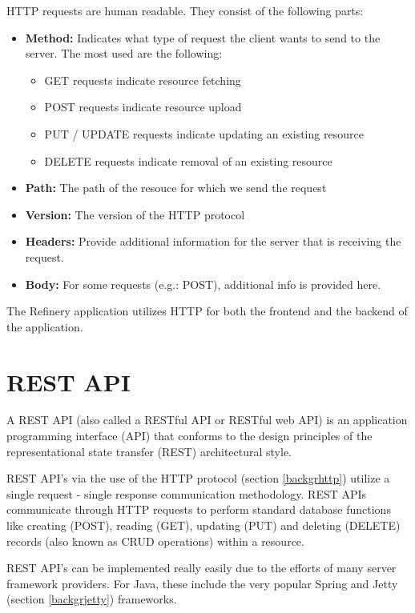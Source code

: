	HTTP requests are human readable. They consist of the following parts:
	\begin{itemize}
		\item \textbf{Method:} Indicates what type of request the client wants to send to the server. The most used are the following:
		\begin{itemize}
			\item GET requests indicate resource fetching
			\item POST requests indicate resource upload 
			\item PUT / UPDATE requests indicate updating an existing resource
			\item DELETE requests indicate removal of an existing resource
		\end{itemize} 
		\item \textbf{Path:} The path of the resouce for which we send the request 
		\item \textbf{Version:} The version of the HTTP protocol
		\item \textbf{Headers:} Provide additional information for the server that is receiving the request. 
		\item \textbf{Body:} For some requests (e.g.: POST), additional info is provided here.
	\end{itemize}

	The Refinery application utilizes HTTP for both the frontend and the backend of the application. 

\section{REST API} \label{backgrrestapi}
	A REST API \cite{restapi} (also called a RESTful API or RESTful web API) is 
	an application programming interface (API) that conforms to the design principles of 
	the representational state transfer (REST) architectural style. 

	REST API's via the use of the HTTP protocol (section \ref{backgrhttp}) utilize a single request - 
	single response communication methodology.
	REST APIs communicate through HTTP requests to perform standard database functions like creating (POST), reading (GET),
	updating (PUT) and deleting (DELETE) records (also known as CRUD operations) within a resource.

	REST API's can be implemented really easily due to the efforts of many server framework providers. For Java, these include 
	the very popular Spring and Jetty (section \ref{backgrjetty}) frameworks. 

